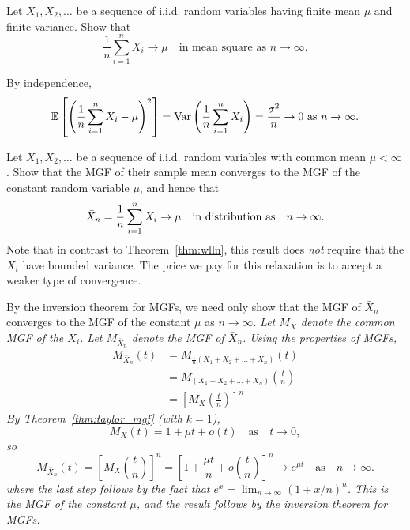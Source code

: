 \begin{exercise}
\begin{questions}

\question
Let $X_1,X_2,\ldots$ be a sequence of i.i.d. random variables having finite mean $\mu$ and finite variance. Show that
\[
\frac{1}{n}\sum_{i=1}^n X_i \to \mu \quad\text{in mean square as } n\to\infty.
\]
\begin{answer}
By independence,
\[
\mathbb{E}\left[\left(\frac{1}{n}\sum_{i=1}^n X_i - \mu\right)^2\right] 
	= \text{Var}\left(\frac{1}{n}\sum_{i=1}^n X_i\right) = \frac{\sigma^2}{n}\to 0 \text{ as } n\to\infty.
\]
\end{answer}

\question
Let $X_1,X_2,\ldots$ be a sequence of i.i.d. random variables with common mean $\mu<\infty$. Show that the MGF of their sample mean converges to the MGF of the constant random variable $\mu$, and hence that
\[
\bar{X}_n = \frac{1}{n}\sum_{i=1}^n X_i \to \mu \text{\quad in distribution as\quad} n\to\infty.
\]
Note that in contrast to Theorem~\ref{thm:wlln}, this result does \emph{not} require that the $X_i$ have bounded variance. The price we pay for this relaxation is to accept a weaker type of convergence.

\begin{answer}
By the inversion theorem for MGFs, we need only show that the MGF of $\bar{X}_n$ converges to the MGF of the constant $\mu$ as $n\to\infty$. 
\bit
\it Let $M_X$ denote the common MGF of the $X_i$.
\it Let $M_{\bar{X}_n}$ denote the MGF of $\bar{X}_n$.
\eit
Using the properties of MGFs,
\begin{align*}
M_{\bar{X}_n}(t) 
	& = M_{\frac{1}{n}(X_1+X_2+\ldots+X_n)}(t) \\
	& = M_{(X_1+X_2+\ldots+X_n)}\left(\frac{t}{n}\right) \\
	& = \left[M_X\left(\frac{t}{n}\right)\right]^n
\end{align*}
By Theorem~\ref{thm:taylor_mgf} (with $k=1$), 
\[
M_X(t) = 1 + \mu t + o(t)\quad\text{as}\quad t\to 0,
\]
so
\[
M_{\bar{X}_n}(t) 
	= \left[M_X\left(\frac{t}{n}\right)\right]^n
	= \left[1 + \frac{\mu t}{n} + o\left(\frac{t}{n}\right)\right]^n
	\to e^{\mu t} \quad\text{as}\quad n\to\infty.
\]
where the last step follows by the fact that $e^x = \lim_{n\to\infty}(1+x/n)^n$. This is the MGF of the constant $\mu$, and the result follows by the inversion theorem for MGFs.
\end{answer}

\end{questions}
\end{exercise}

